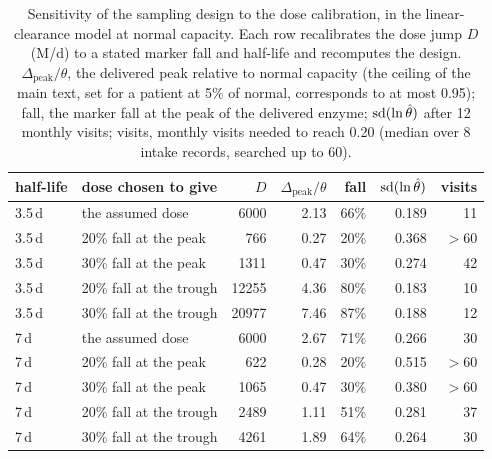 \begin{table}[htbp]
\centering\small
\caption{\label{stab:dosesens}Sensitivity of the sampling design to the dose calibration, in the
linear-clearance model at normal capacity. Each row recalibrates the dose jump $D$ (\textmu M/d)
to a stated marker fall and half-life and recomputes the design. $\Delta_{\mathrm{peak}}/\theta$,
the delivered peak relative to normal capacity (the ceiling of the main text, set for a patient
at 5\% of normal, corresponds to at most 0.95); fall, the marker fall at the peak of the delivered enzyme; $\operatorname{sd}(\ln \hat\theta)$ after
12 monthly visits; visits, monthly visits needed to reach 0.20 (median over 8 intake records,
searched up to 60).}
\begin{tabular}{@{}llrrrrr@{}}
\toprule
half-life & dose chosen to give & $D$ & $\Delta_{\mathrm{peak}}/\theta$ & fall &
$\operatorname{sd}(\ln \hat\theta)$ & visits \\
\midrule
3.5\,d & the assumed dose & 6000 & 2.13 & 66\% & 0.189 & 11 \\
3.5\,d & 20\% fall at the peak & 766 & 0.27 & 20\% & 0.368 & $>60$ \\
3.5\,d & 30\% fall at the peak & 1311 & 0.47 & 30\% & 0.274 & 42 \\
3.5\,d & 20\% fall at the trough & 12255 & 4.36 & 80\% & 0.183 & 10 \\
3.5\,d & 30\% fall at the trough & 20977 & 7.46 & 87\% & 0.188 & 12 \\
7\,d & the assumed dose & 6000 & 2.67 & 71\% & 0.266 & 30 \\
7\,d & 20\% fall at the peak & 622 & 0.28 & 20\% & 0.515 & $>60$ \\
7\,d & 30\% fall at the peak & 1065 & 0.47 & 30\% & 0.380 & $>60$ \\
7\,d & 20\% fall at the trough & 2489 & 1.11 & 51\% & 0.281 & 37 \\
7\,d & 30\% fall at the trough & 4261 & 1.89 & 64\% & 0.264 & 30 \\
\bottomrule
\end{tabular}
\end{table}

